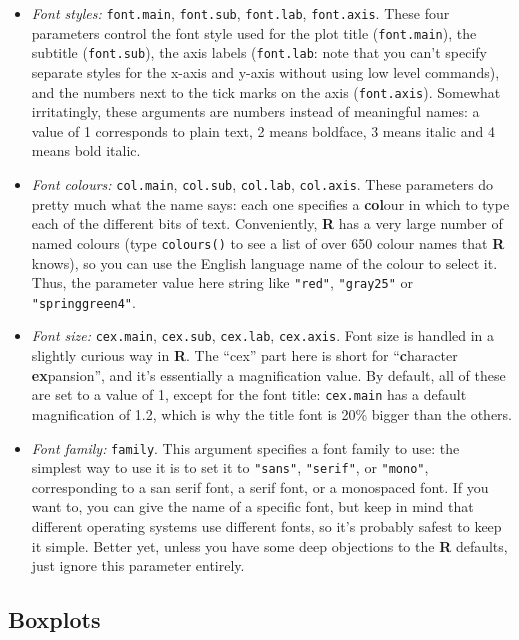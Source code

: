 \documentclass[]{book}
\begin{document}
\begin{itemize}
\item
  \emph{Font styles:} \texttt{font.main}, \texttt{font.sub}, \texttt{font.lab}, \texttt{font.axis}. These four parameters control the font style used for the plot title (\texttt{font.main}), the subtitle (\texttt{font.sub}), the axis labels (\texttt{font.lab}: note that you can't specify separate styles for the x-axis and y-axis without using low level commands), and the numbers next to the tick marks on the axis (\texttt{font.axis}). Somewhat irritatingly, these arguments are numbers instead of meaningful names: a value of 1 corresponds to plain text, 2 means boldface, 3 means italic and 4 means bold italic.
\item
  \emph{Font colours:} \texttt{col.main}, \texttt{col.sub}, \texttt{col.lab}, \texttt{col.axis}. These parameters do pretty much what the name says: each one specifies a \textbf{col}our in which to type each of the different bits of text. Conveniently, \textbf{R} has a very large number of named colours (type \texttt{colours()} to see a list of over 650 colour names that \textbf{R} knows), so you can use the English language name of the colour to select it. Thus, the parameter value here string like \texttt{"red"}, \texttt{"gray25"} or \texttt{"springgreen4"}.
\item
  \emph{Font size:} \texttt{cex.main}, \texttt{cex.sub}, \texttt{cex.lab}, \texttt{cex.axis}. Font size is handled in a slightly curious way in \textbf{R}. The ``cex'' part here is short for ``\textbf{c}haracter \textbf{ex}pansion'', and it's essentially a magnification value. By default, all of these are set to a value of 1, except for the font title: \texttt{cex.main} has a default magnification of 1.2, which is why the title font is 20\% bigger than the others.
\item
  \emph{Font family:} \texttt{family}. This argument specifies a font family to use: the simplest way to use it is to set it to \texttt{"sans"}, \texttt{"serif"}, or \texttt{"mono"}, corresponding to a san serif font, a serif font, or a monospaced font. If you want to, you can give the name of a specific font, but keep in mind that different operating systems use different fonts, so it's probably safest to keep it simple. Better yet, unless you have some deep objections to the \textbf{R} defaults, just ignore this parameter entirely.
\end{itemize}

\hypertarget{boxplots}{%
\subsection{Boxplots}\label{boxplots}}
\end{document}
